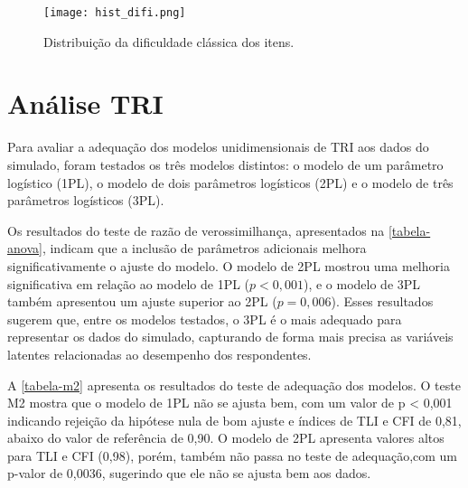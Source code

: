 \begin{figure}[H]
	\centering
	\texttt{[image: hist\_difi.png]}
	\caption{Distribuição da dificuldade clássica dos itens.}
	\label{fig:hist_difi}
\end{figure}


\section{Análise TRI}

Para avaliar a adequação dos modelos unidimensionais de TRI aos dados do simulado, foram
testados os três modelos distintos: o modelo de um parâmetro logístico (1PL), o modelo de dois parâmetros logísticos (2PL) e o modelo de três parâmetros logísticos (3PL).

Os resultados do teste de razão de verossimilhança, apresentados na \ref{tabela-anova}, indicam que a inclusão de parâmetros adicionais melhora significativamente o ajuste do modelo. O modelo de 2PL mostrou uma melhoria significativa em relação ao modelo de 1PL ($p < 0,001$), e o modelo de 3PL também apresentou um ajuste superior ao 2PL ($p = 0,006$). Esses resultados sugerem que, entre os modelos testados, o 3PL é o mais adequado para representar os dados do simulado, capturando de forma mais precisa as variáveis latentes relacionadas ao desempenho dos respondentes.


\begin{table}[!htb]
\end{table}

A \ref{tabela-m2} apresenta os resultados do teste de adequação dos modelos. O teste M2 mostra que o modelo de 1PL não se ajusta bem, com um valor de p < 0,001 indicando rejeição da hipótese nula de bom ajuste e índices de TLI e CFI de 0,81, abaixo do valor de referência de 0,90. O modelo de 2PL apresenta valores altos para TLI e CFI (0,98), porém, também não passa no teste de adequação,com um p-valor de 0,0036, sugerindo que ele não se ajusta bem aos dados.

